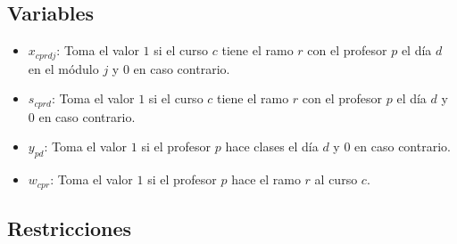 \documentclass[letterpaper]{article}
\begin{document}
\subsection{Variables}
\begin{itemize}
    \item $x_{cprdj}$: Toma el valor $1$ si el curso $c$ tiene el ramo $r$ con el profesor $p$ el día $d$ en el módulo $j$ y $0$ en caso contrario.
    \item $s_{cprd}$: Toma el valor $1$ si el curso $c$ tiene el ramo $r$ con el profesor $p$ el día $d$ y $0$ en caso contrario.
    \item $y_{pd}$: Toma el valor $1$ si el profesor $p$ hace clases el día $d$ y $0$ en caso contrario.
    \item $w_{cpr}$: Toma el valor $1$ si el profesor $p$ hace el ramo $r$ al curso $c$.
\end{itemize}

\subsection{Restricciones}
\end{document}
